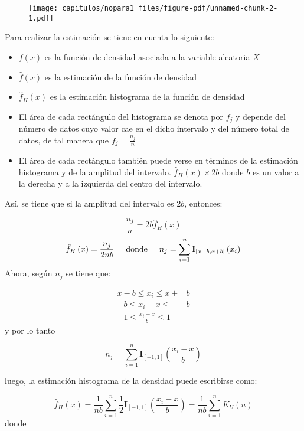\documentclass[
  letterpaper,
  DIV=11,
  numbers=noendperiod]{scrreprt}
\providecommand{\tightlist}{%
  \setlength{\itemsep}{0pt}\setlength{\parskip}{0pt}}\usepackage{longtable,booktabs,array}
\begin{document}
\begin{figure}[H]

{\centering \texttt{[image: capitulos/nopara1\_files/figure-pdf/unnamed-chunk-2-1.pdf]}

}

\end{figure}

Para realizar la estimación se tiene en cuenta lo siguiente:

\begin{itemize}
\tightlist
\item
  \(f\left(x\right)\) es la función de densidad asociada a la variable
  aleatoria \(X\)
\item
  \(\hat{f}\left(x\right)\) es la estimación de la función de densidad
\item
  \(\hat f_H \left(x\right)\) es la estimación histograma de la función
  de densidad
\item
  El área de cada rectángulo del histograma se denota por \(f_j\) y
  depende del número de datos cuyo valor cae en el dicho intervalo y del
  número total de datos, de tal manera que \(f_j = \frac{n_j}{n}\)
\item
  El área de cada rectángulo también puede verse en términos de la
  estimación histograma y de la amplitud del intervalo.
  \(\hat{f}_H \left(x\right) \times 2b\) donde \(b\) es un valor a la
  derecha y a la izquierda del centro del intervalo.
\end{itemize}

Así, se tiene que si la amplitud del intervalo es \(2b\), entonces:

\[\frac{n_j}{n} = 2b \hat{f}_H \left(x\right)\]
\[\hat{f}_H \left(x\right)=\frac{n_j}{2nb} \hspace{0.5cm} \textrm{donde} \hspace{0.5cm} n_j=\sum_{i=1}^n \mathbf{I}_{\left[x-b, x+b\right]} \left(x_i\right)\]
Ahora, según \(n_j\) se tiene que:

\[ 
\begin{align}
x-b \leq x_i \leq x+&b\\
-b \leq x_i-x \leq &b\\
-1 \leq \frac{x_i-x}{b} \leq 1
\end{align}
\] y por lo tanto

\[n_j = \sum_{i=1}^n \mathbf{I}_{\left[-1,1\right]}\left(\frac{x_i-x}{b}\right)\]

luego, la estimación histograma de la densidad puede escribirse como:

\[\hat{f}_H \left(x\right) = \frac{1}{nb} \sum_{i=1}^n \frac{1}{2} \mathbf{I}_{\left[-1,1\right]}\left(\frac{x_i-x}{b}\right) = \frac{1}{nb} \sum_{i=1}^n K_U\left(u\right)\]
donde
\end{document}
